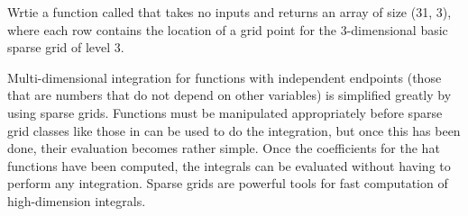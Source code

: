 \begin{problem}
Wrtie a function called  that takes no inputs and returns an array of size (31, 3), where each row contains the location of a grid point for the $3$-dimensional basic sparse grid of level $3$.
\end{problem}

Multi-dimensional integration for functions with independent endpoints (those that are numbers that do not depend on other variables) is simplified greatly by using sparse grids.  Functions must be manipulated appropriately before sparse grid classes like those in  can be used to do the integration, but once this has been done, their evaluation becomes rather simple.  Once the coefficients for the hat functions have been computed, the integrals can be evaluated without having to perform any integration.  Sparse grids are powerful tools for fast computation of high-dimension integrals.  

